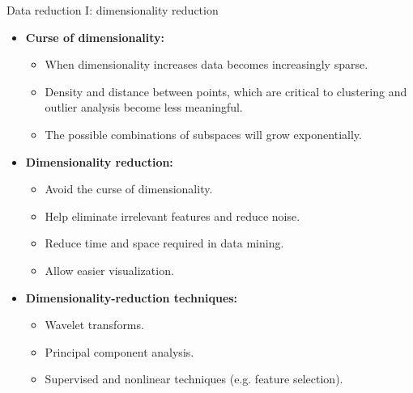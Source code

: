 \documentclass[aspectratio=169,t]{beamer}
\begin{document}
  { 
    \begin{frame}{Data reduction I: dimensionality reduction}
        \begin{itemize}
            \item \textbf{Curse of dimensionality:}
            \begin{itemize}
              \item When dimensionality increases data becomes increasingly sparse.
              \item Density and distance between points, which are critical to clustering and outlier analysis become less meaningful.
              \item The possible combinations of subspaces will grow exponentially.
            \end{itemize}
            \item \textbf{Dimensionality reduction:}
            \begin{itemize}
              \item Avoid the curse of dimensionality.
              \item Help eliminate irrelevant features and reduce noise.
              \item Reduce time and space required in data mining.
              \item Allow easier visualization.
            \end{itemize}
            \item \textbf{Dimensionality-reduction techniques:}
            \begin{itemize}
              \item Wavelet transforms.
              \item Principal component analysis.
              \item Supervised and nonlinear techniques (e.g. feature selection).
            \end{itemize}
        \end{itemize}
    \end{frame}
  }
\end{document}
